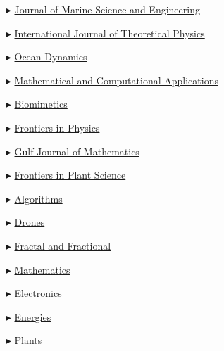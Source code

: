 \begin{itemize}
    \item[$\blacktriangleright$] \href{https://www.mdpi.com/journal/jmse/}{Journal of Marine Science and Engineering}

    \item[$\blacktriangleright$] \href{https://link.springer.com/journal/10773/}{International Journal of Theoretical Physics}

    \item[$\blacktriangleright$] \href{https://link.springer.com/journal/10236/}{Ocean Dynamics}
    
    \item[$\blacktriangleright$] \href{https://www.mdpi.com/journal/mca/}{Mathematical and Computational Applications}

    \item[$\blacktriangleright$] \href{https://www.mdpi.com/journal/biomimetics/}{Biomimetics}

    \item[$\blacktriangleright$] \href{https://www.frontiersin.org/journals/physics/}{Frontiers in Physics}

    \item[$\blacktriangleright$] \href{https://gjom.org/}{Gulf Journal of Mathematics}

    \item[$\blacktriangleright$] \href{https://www.frontiersin.org/journals/plant-science/}{
Frontiers in Plant Science}

    \item[$\blacktriangleright$] \href{https://www.mdpi.com/journal/algorithms/}{Algorithms}

    \item[$\blacktriangleright$] \href{https://www.mdpi.com/journal/drones/}{Drones}

    \item[$\blacktriangleright$] \href{https://www.mdpi.com/journal/fractalfract/}{Fractal and Fractional}

    \item[$\blacktriangleright$] \href{https://www.mdpi.com/journal/mathematics/}{Mathematics}

    \item[$\blacktriangleright$] \href{https://www.mdpi.com/journal/electronics/}{Electronics}

    \item[$\blacktriangleright$] \href{https://www.mdpi.com/journal/energies/}{Energies}

    \item[$\blacktriangleright$] \href{https://www.mdpi.com/journal/plants/}{Plants}


\end{itemize}
